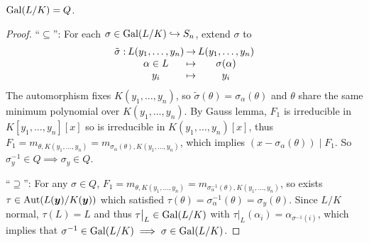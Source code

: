 \begin{prop}
  $\operatorname{Gal}(L/K) = Q$.

  \begin{proof}
    ``$\subseteq$'': For each $\sigma \in \operatorname{Gal}(L/K) \hookrightarrow S_n$, extend $\sigma$ to
    \[
      \arraycolsep=1pt
      \begin{array}{rccc}
        \tilde\sigma: & L(y_1, \dots, y_n) & \to & L(y_1, \dots, y_n) \\
        & \alpha \in L & \mapsto & \sigma(\alpha) \\
        & y_i & \mapsto & y_i
      \end{array}
    \]
    The automorphism fixes $K(y_1, \dots, y_n)$, so
    $\tilde\sigma(\theta) = \sigma_\alpha(\theta)$ and $\theta$ share the
    same minimum polynomial over $K(y_1, \dots, y_n)$.
    By Gauss lemma, $F_1$ is irreducible in $K[y_1, \dots, y_n][x]$ so is irreducible
    in $K(y_1, \dots, y_n)[x]$, thus $F_1 = m_{\theta, K(y_1, \dots, y_n)}
    = m_{\sigma_\alpha(\theta), K(y_1, \dots, y_n)}$, which implies $(x - \sigma_\alpha(\theta)) \mid F_1$.
    So $\sigma_y^{-1} \in Q \implies \sigma_y \in Q$.

    ``$\supseteq$'': For any $\sigma \in Q$, $F_1 = m_{\theta, K(y_1, \dots, y_n)}
    = m_{\sigma^{-1}_\alpha(\theta), K(y_1, \dots, y_n)}$, so exists
    $\tau \in \operatorname{Aut}(L(\bm{y}) / K(\bm{y}))$ which satisfied
    $\tau(\theta) = \sigma_\alpha^{-1}(\theta) = \sigma_y(\theta)$.
    Since $L/K$ normal, $\tau(L) = L$ and thus $\tau\big|_L \in \operatorname{Gal}(L/K)$ with
    $\tau\big|_L(\alpha_i) = \alpha_{\sigma^{-1}(i)}$, which implies that
    $\sigma^{-1} \in \operatorname{Gal}(L/K) \implies \sigma \in \operatorname{Gal}(L/K)$.
  \end{proof}
\end{prop}

